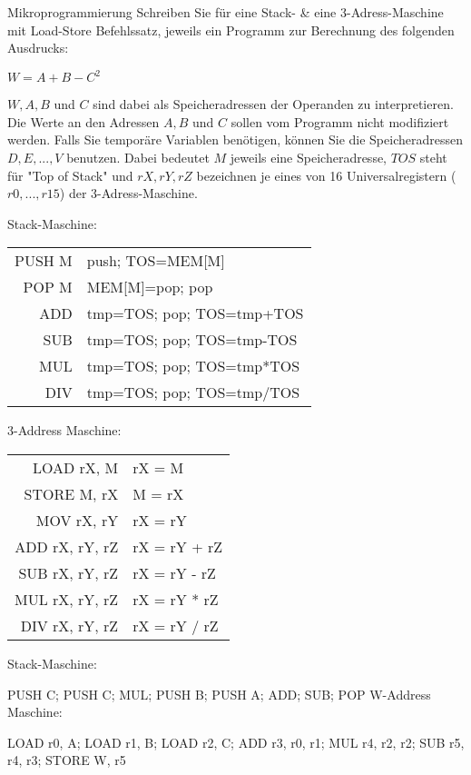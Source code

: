\documentclass{exercisesheet}
\begin{document}
\begin{exercise}{Mikroprogrammierung}
  Schreiben Sie für eine Stack- \& eine 3-Adress-Maschine mit Load-Store Befehlssatz, jeweils ein Programm zur Berechnung des folgenden Ausdrucks:\par
  \begin{center}$W = A + B - C^2$\end{center}
  $W, A, B$ und $C$ sind dabei als Speicheradressen der Operanden zu interpretieren. Die Werte an den Adressen $A, B$ und $C$ sollen vom Programm nicht modifiziert werden. Falls Sie temporäre Variablen benötigen, können Sie die Speicheradressen $D, E, ..., V$ benutzen. Dabei bedeutet $M$ jeweils eine Speicheradresse, $TOS$ steht für "Top of Stack" und $rX, rY, rZ$ bezeichnen je eines von 16 Universalregistern ($r0, ..., r15$) der 3-Adress-Maschine.

  \begin{multicols}{2}
    Stack-Maschine:\par
    \begin{tabular}{|r|l|}
      \hline
      PUSH M & push; TOS=MEM[M]          \\
      POP M  & MEM[M]=pop; pop           \\
      ADD    & tmp=TOS; pop; TOS=tmp+TOS \\
      SUB    & tmp=TOS; pop; TOS=tmp-TOS \\
      MUL    & tmp=TOS; pop; TOS=tmp*TOS \\
      DIV    & tmp=TOS; pop; TOS=tmp/TOS \\
      \hline
    \end{tabular}
    \columnbreak

    3-Address Maschine:\par
    \begin{tabular}{|r|l|}
      \hline
      LOAD rX, M     & rX = M       \\
      STORE M, rX    & M = rX       \\
      MOV rX, rY     & rX = rY      \\
      ADD rX, rY, rZ & rX = rY + rZ \\
      SUB rX, rY, rZ & rX = rY - rZ \\
      MUL rX, rY, rZ & rX = rY * rZ \\
      DIV rX, rY, rZ & rX = rY / rZ \\
      \hline
    \end{tabular}
  \end{multicols}

  \begin{solution}
    Stack-Maschine:\par PUSH C; PUSH C; MUL; PUSH B; PUSH A; ADD; SUB; POP W-Address Maschine:\par LOAD r0, A; LOAD r1, B; LOAD r2, C; ADD r3, r0, r1; MUL r4, r2, r2;  SUB r5, r4, r3; STORE W, r5
  \end{solution}
\end{exercise}
\end{document}
